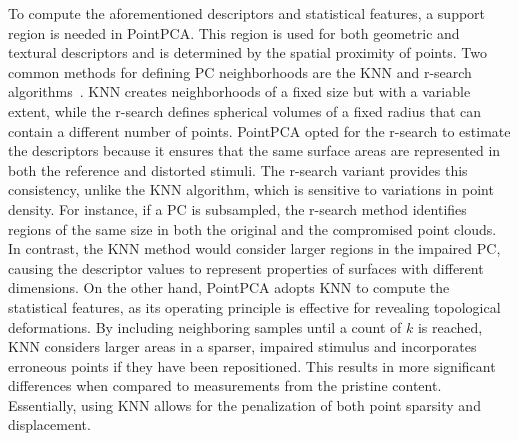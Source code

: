 \documentclass[final,3p,times,twocolumn]{elsarticle}
\begin{document}
To compute the aforementioned descriptors and statistical features, a support region is needed in PointPCA. This region is used for both geometric and textural descriptors and is determined by the spatial proximity of points. Two common methods for defining \gls{PC} neighborhoods are the \gls{KNN} and \gls{r-search} algorithms~\cite{behley2015efficient}. \gls{KNN} creates neighborhoods of a fixed size but with a variable extent, while the \gls{r-search} defines spherical volumes of a fixed radius that can contain a different number of points. 
PointPCA opted for the \gls{r-search} to estimate the descriptors because it ensures that the same surface areas are represented in both the reference and distorted stimuli. The \gls{r-search} variant provides this consistency, unlike the \gls{KNN} algorithm, which is sensitive to variations in point density. 
For instance, if a \gls{PC} is subsampled, the \gls{r-search} method identifies regions of the same size in both the original and the compromised point clouds. In contrast, the \gls{KNN} method would consider larger regions in the impaired \gls{PC}, causing the descriptor values to represent properties of surfaces with different dimensions. On the other hand, PointPCA adopts \gls{KNN} to compute the statistical features, as its operating principle is effective for revealing topological deformations. By including neighboring samples until a count of $k$ is reached, \gls{KNN} considers larger areas in a sparser, impaired stimulus and incorporates erroneous points if they have been repositioned. This results in more significant differences when compared to measurements from the pristine content. Essentially, using \gls{KNN} allows for the penalization of both point sparsity and displacement.
\end{document}

